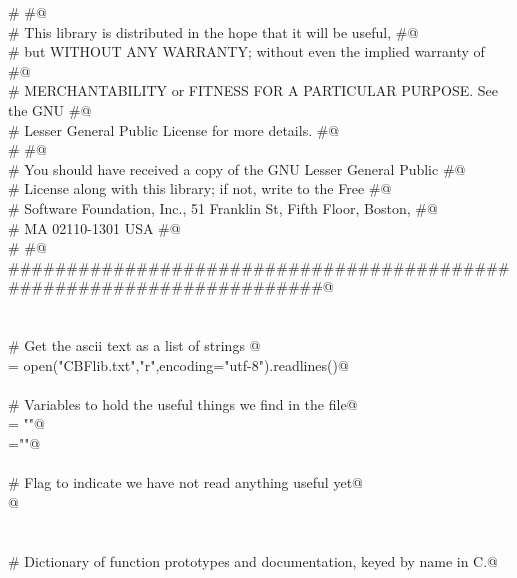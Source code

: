 \documentclass[10pt,a4paper,twoside,notitlepage]{article}
\begin{document}
\begin{flushleft}
\begin{minipage}{\linewidth}
\begin{list}{}{}
\mbox{}\verb@#                                                                    #@\\
\mbox{}\verb@# This library is distributed in the hope that it will be useful,    #@\\
\mbox{}\verb@# but WITHOUT ANY WARRANTY; without even the implied warranty of     #@\\
\mbox{}\verb@# MERCHANTABILITY or FITNESS FOR A PARTICULAR PURPOSE.  See the GNU  #@\\
\mbox{}\verb@# Lesser General Public License for more details.                    #@\\
\mbox{}\verb@#                                                                    #@\\
\mbox{}\verb@# You should have received a copy of the GNU Lesser General Public   #@\\
\mbox{}\verb@# License along with this library; if not, write to the Free         #@\\
\mbox{}\verb@# Software Foundation, Inc., 51 Franklin St, Fifth Floor, Boston,    #@\\
\mbox{}\verb@# MA  02110-1301  USA                                                #@\\
\mbox{}\verb@#                                                                    #@\\
\mbox{}\verb@######################################################################@\\
\mbox{}\verb@@\\
\mbox{}\verb@@\\
\mbox{}\verb@# Get the ascii text as a list of strings @\\
\mbox{}\verb@lines = open("CBFlib.txt","r",encoding="utf-8").readlines()@\\
\mbox{}\verb@@\\
\mbox{}\verb@# Variables to hold the useful things we find in the file@\\
\mbox{}\verb@docstring = "\n"@\\
\mbox{}\verb@name=""@\\
\mbox{}\verb@@\\
\mbox{}\verb@# Flag to indicate we have not read anything useful yet@\\
\mbox{}@\\
\mbox{}\verb@@\\
\mbox{}\verb@@\\
\mbox{}\verb@# Dictionary of function prototypes and documentation, keyed by name in C.@\\

\end{list}
\end{minipage}
\end{flushleft}
\end{document}
